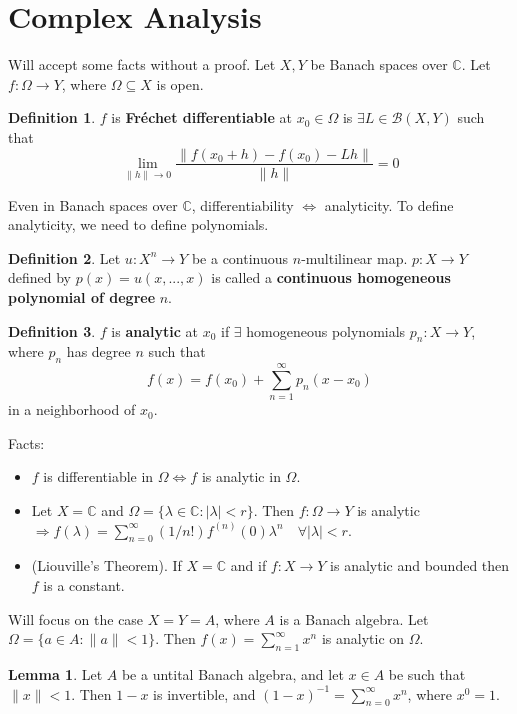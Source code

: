 \documentclass{article}
\theoremstyle{definition}
\newtheorem{lem}{Lemma}
\newtheorem{dfn}{Definition}
\newcommand{\B}{\mathcal B}
\newcommand{\CC}{\mathbb C}
\newcommand{\Ra}{\Rightarrow}
\newcommand{\Lra}{\Leftrightarrow}
\begin{document}
\section{Complex Analysis}

Will accept some facts without a proof.
Let $X, Y$ be Banach spaces over $\CC$.
Let $f: \Omega \to Y$, where $\Omega \subseteq X$ is open.

\begin{dfn}
	$f$ is \textbf{Fr\'echet differentiable} at $x_0 \in \Omega$ is $\exists L \in \B(X, Y)$ such that
	\[
		\lim_{\|h\| \to 0} \frac{\|f(x_0 + h) - f(x_0) - L h\|}{\|h\|} = 0
	\]
\end{dfn}

Even in Banach spaces over $\CC$, differentiability $\Lra$ analyticity.
To define analyticity, we need to define polynomials.

\begin{dfn}
	Let $u: X^n \to Y$ be a continuous $n$-multilinear map.
	$p: X \to Y$ defined by $p(x) = u(x, ..., x)$ is called a \textbf{continuous homogeneous polynomial of degree} $n$.
\end{dfn}

\begin{dfn}
	$f$ is \textbf{analytic} at $x_0$ if $\exists$ homogeneous polynomials $p_n: X \to Y$, where $p_n$ has degree $n$ such that
	\[
		f(x) = f(x_0) + \sum_{n = 1}^\infty p_n(x - x_0)
	\]
	in a neighborhood of $x_0$.
\end{dfn}

Facts:
\begin{itemize}
	\item $f$ is differentiable in $\Omega \Lra f$ is analytic in $\Omega$.

	\item Let $X = \CC$ and $\Omega = \{\lambda \in \CC: |\lambda| < r\}$.
		Then $f: \Omega \to Y$ is analytic $\Ra f(\lambda) = \sum_{n = 0}^\infty (1/n!) f^{(n)} (0) \lambda^n \quad \forall |\lambda| < r$.

	\item (Liouville's Theorem).
		If $X = \CC$ and if $f: X \to Y$ is analytic and bounded then $f$ is a constant.
\end{itemize}

Will focus on the case $X = Y = A$, where $A$ is a Banach algebra.
Let $\Omega = \{a \in A: \|a\| < 1\}$.
Then $f(x) = \sum_{n = 1}^\infty x^n$ is analytic on $\Omega$.

\begin{lem}
	Let $A$ be a untital Banach algebra, and let $x \in A$ be such that $\|x\| < 1$.
	Then $1 - x$ is invertible, and $(1 - x)^{-1} = \sum_{n = 0}^\infty x^n$, where $x^0 = 1$.
\end{lem}
\end{document}
